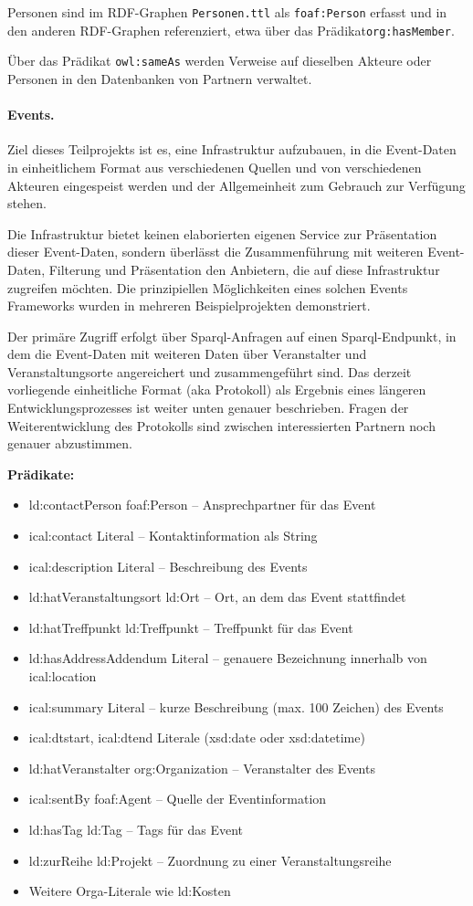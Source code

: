 \documentclass[a4paper,11pt]{article}
\begin{document}
Personen sind im RDF-Graphen \texttt{Personen.ttl} als \texttt{foaf:Person}
erfasst und in den anderen RDF-Graphen referenziert, etwa über das
Prädikat\texttt{org:hasMember}.

Über das Prädikat \texttt{owl:sameAs} werden Verweise auf dieselben Akteure
oder Personen in den Datenbanken von Partnern verwaltet. 

\paragraph{Events.}
Ziel dieses Teilprojekts ist es, eine Infrastruktur aufzubauen, in die
Event-Daten in einheitlichem Format aus verschiedenen Quellen und von
verschiedenen Akteuren eingespeist werden und der Allgemeinheit zum Gebrauch
zur Verfügung stehen.

Die Infrastruktur bietet keinen elaborierten eigenen Service zur Präsentation
dieser Event-Daten, sondern überlässt die Zusammenführung mit weiteren
Event-Daten, Filterung und Präsentation den Anbietern, die auf diese
Infrastruktur zugreifen möchten. Die prinzipiellen Möglichkeiten eines solchen
Events Frameworks wurden in mehreren Beispielprojekten demonstriert. 

Der primäre Zugriff erfolgt über Sparql-Anfragen auf einen Sparql-Endpunkt, in
dem die Event-Daten mit weiteren Daten über Veranstalter und
Veranstaltungsorte angereichert und zusammengeführt sind.  Das derzeit
vorliegende einheitliche Format (aka Protokoll) als Ergebnis eines längeren
Entwicklungsprozesses ist weiter unten genauer beschrieben. Fragen der
Weiterentwicklung des Protokolls sind zwischen interessierten Partnern noch
genauer abzustimmen.

\textbf{Prädikate:}
\begin{itemize}\itemsep0pt
\item ld:contactPerson foaf:Person – Ansprechpartner für das Event
\item ical:contact Literal – Kontaktinformation als String
\item ical:description Literal – Beschreibung des Events
\item ld:hatVeranstaltungsort ld:Ort – Ort, an dem das Event stattfindet
\item ld:hatTreffpunkt ld:Treffpunkt – Treffpunkt für das Event
\item ld:hasAddressAddendum Literal – genauere Bezeichnung innerhalb von
  ical:location
\item ical:summary Literal – kurze Beschreibung (max. 100 Zeichen) des Events
\item ical:dtstart, ical:dtend Literale (xsd:date oder xsd:datetime)
\item ld:hatVeranstalter org:Organization – Veranstalter des Events
\item ical:sentBy foaf:Agent – Quelle der Eventinformation
\item ld:hasTag ld:Tag – Tags für das Event
\item ld:zurReihe ld:Projekt – Zuordnung zu einer Veranstaltungsreihe
\item Weitere Orga-Literale wie ld:Kosten
\end{itemize}
\newpage
\end{document}
